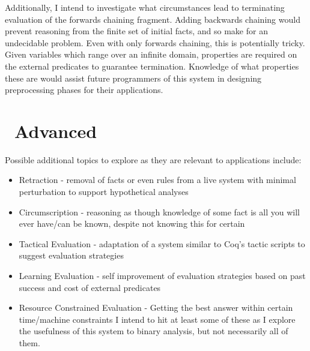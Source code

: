 Additionally, I intend to investigate what circumstances lead to terminating evaluation of the forwards chaining fragment.
Adding backwards chaining would prevent reasoning from the finite set of initial facts, and so make for an undecidable problem.
Even with only forwards chaining, this is potentially tricky.
Given variables which range over an infinite domain, properties are required on the external predicates to guarantee termination.
Knowledge of what properties these are would assist future programmers of this system in designing preprocessing phases for their applications.
\section{\sysname\ Advanced}
Possible additional topics to explore as they are relevant to applications include:
\begin{itemize}
\item Retraction - removal of facts or even rules from a live system with minimal perturbation to support hypothetical analyses
\item Circumscription - reasoning as though knowledge of some fact is all you will ever have/can be known, despite not knowing this for certain
\item Tactical Evaluation - adaptation of a system similar to Coq's tactic scripts to suggest evaluation strategies
\item Learning Evaluation - self improvement of evaluation strategies based on past success and cost of external predicates
\item Resource Constrained Evaluation - Getting the best answer within certain time/machine constraints
I intend to hit at least some of these as I explore the usefulness of this system to binary analysis, but not necessarily all of them.
\end{itemize}
